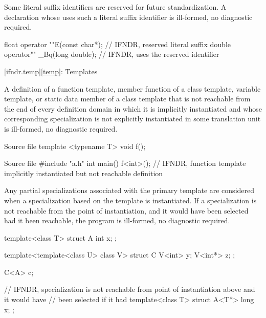 \pnum
Some literal suffix identifiers are
reserved for future standardization. A declaration whose  uses such a literal
suffix identifier is ill-formed, no diagnostic required.

\pnum
\begin{example}
\begin{codeblock}
float operator ""E(const char*);        // IFNDR, reserved literal suffix
double operator"" _Bq(long double);     // IFNDR, uses the reserved identifier 
\end{codeblock}
\end{example}

[ifndr.temp]{\ref*{temp}: Templates}


\pnum
A definition of a function template,
member function of a class template,
variable template,
or static data member of a class template
that is not reachable from
the end of every definition domain
in which it is implicitly instantiated
and whose corresponding specialization
is not explicitly instantiated in some translation unit
is ill-formed, no diagnostic required.

\pnum
\begin{example}
\begin{codeblocktu}{Source file }
template <typename T>
void f();
\end{codeblocktu}
\begin{codeblocktu}{Source file }
#include "a.h"
int main() {
    f<int>();   // IFNDR, function template implicitly instantiated but not reachable definition
}
\end{codeblocktu}
\end{example}


\pnum
Any partial specializations
associated with the primary template are considered when a specialization
based on the template  is instantiated.
If a specialization is not reachable
from the point of instantiation,
and it would have been selected had it been reachable,
the program is ill-formed, no diagnostic required.

\pnum
\begin{example}
\begin{codeblock}
template<class T> struct A {
  int x;
};

template<template<class U> class V> struct C {
  V<int> y;
  V<int*> z;
};

C<A> c;

// IFNDR, specialization is not reachable from point of instantiation above and it would have
// been selected if it had
template<class T> struct A<T*> {
  long x;
};
\end{codeblock}
\end{example}

